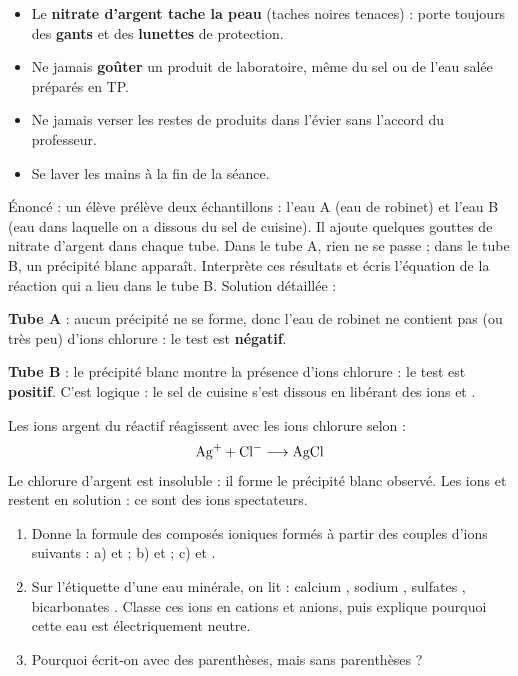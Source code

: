\documentclass[11pt]{article}
\begin{document}
\begin{attention}
\begin{itemize}
\item Le \textbf{nitrate d'argent tache la peau} (taches noires tenaces) : porte toujours des \textbf{gants} et des \textbf{lunettes} de protection.
\item Ne jamais \textbf{goûter} un produit de laboratoire, même du sel ou de l'eau salée préparés en TP.
\item Ne jamais verser les restes de produits dans l'évier sans l'accord du professeur.
\item Se laver les mains à la fin de la séance.
\end{itemize}
\end{attention}

\begin{exoresolu}
Énoncé : un élève prélève deux échantillons : l'eau A (eau de robinet) et l'eau B (eau dans laquelle on a dissous du sel de cuisine). Il ajoute quelques gouttes de nitrate d'argent dans chaque tube. Dans le tube A, rien ne se passe ; dans le tube B, un précipité blanc apparaît. Interprète ces résultats et écris l'équation de la réaction qui a lieu dans le tube B.
\tcblower
Solution détaillée :

\textbf{Tube A} : aucun précipité ne se forme, donc l'eau de robinet ne contient pas (ou très peu) d'ions chlorure  : le test est \textbf{négatif}.

\textbf{Tube B} : le précipité blanc montre la présence d'ions chlorure : le test est \textbf{positif}. C'est logique : le sel de cuisine  s'est dissous en libérant des ions  et .

Les ions argent du réactif réagissent avec les ions chlorure selon :
\[ \ce{Ag+} + \ce{Cl-} \longrightarrow \ce{AgCl} \]
Le chlorure d'argent  est insoluble : il forme le précipité blanc observé. Les ions  et  restent en solution : ce sont des ions spectateurs.
\end{exoresolu}

\begin{exercice}
\begin{enumerate}
\item Donne la formule des composés ioniques formés à partir des couples d'ions suivants : a)  et  ; b)  et  ; c)  et .
\item Sur l'étiquette d'une eau minérale, on lit : calcium , sodium , sulfates , bicarbonates . Classe ces ions en cations et anions, puis explique pourquoi cette eau est électriquement neutre.
\item Pourquoi écrit-on  avec des parenthèses, mais  sans parenthèses ?
\end{enumerate}
\end{exercice}
\end{document}
